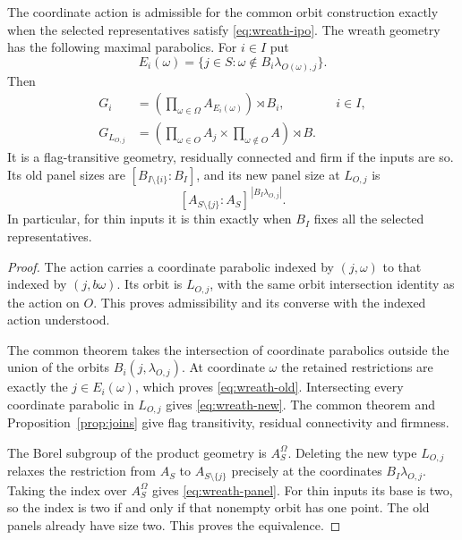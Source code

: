 \begin{proposition}\label{prop:wreath}
The coordinate action is admissible for the common orbit construction
exactly when the selected representatives satisfy
\eqref{eq:wreath-ipo}. The wreath geometry has the following maximal
parabolics. For $i\in I$ put
\[
 E_i(\omega)=\{j\in S:\omega\notin B_i\lambda_{O(\omega),j}\}.
\]
Then
\begin{align}
 G_i&=\left(\prod_{\omega\in\Omega}A_{E_i(\omega)}\right)\rtimes B_i,
          &&i\in I,\label{eq:wreath-old}\\
 G_{L_{O,j}}&=\left(\prod_{\omega\in O}A_j\times
                     \prod_{\omega\notin O}A\right)\rtimes B.
          \label{eq:wreath-new}
\end{align}
It is a flag-transitive geometry, residually connected and firm if the
inputs are so. Its old panel sizes are
$[B_{I\setminus\{i\}}:B_I]$, and its new panel size at $L_{O,j}$ is
\begin{equation}\label{eq:wreath-panel}
 [A_{S\setminus\{j\}}:A_S]^{\,|B_I\lambda_{O,j}|}.
\end{equation}
In particular, for thin inputs it is thin exactly when $B_I$ fixes
all the selected representatives.
\end{proposition}
\begin{proof}
The action carries a coordinate parabolic indexed by $(j,\omega)$
to that indexed by $(j,b\omega)$. Its orbit is $L_{O,j}$, with the
same orbit intersection identity as the action on $O$. This proves
admissibility and its converse with the indexed action understood.

The common theorem takes the intersection of coordinate parabolics
outside the union of the orbits $B_i(j,\lambda_{O,j})$. At coordinate
$\omega$ the retained restrictions are exactly the $j\in E_i(\omega)$,
which proves \eqref{eq:wreath-old}. Intersecting every coordinate
parabolic in $L_{O,j}$ gives \eqref{eq:wreath-new}. The common theorem
and Proposition~\ref{prop:joins} give flag transitivity, residual
connectivity and firmness.

The Borel subgroup of the product geometry is $A_S^\Omega$. Deleting
the new type $L_{O,j}$ relaxes the restriction from $A_S$ to
$A_{S\setminus\{j\}}$ precisely at the coordinates
$B_I\lambda_{O,j}$. Taking the index over $A_S^\Omega$ gives
\eqref{eq:wreath-panel}. For thin inputs its base is two, so the
index is two if and only if that nonempty orbit has one point.
The old panels already have size two. This proves the equivalence.
\end{proof}


